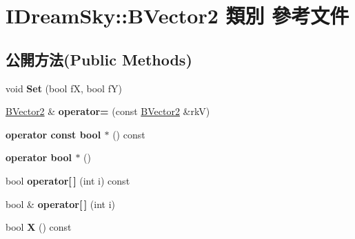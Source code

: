 \hypertarget{class_i_dream_sky_1_1_b_vector2}{}\section{I\+Dream\+Sky\+:\+:B\+Vector2 類別 參考文件}
\label{class_i_dream_sky_1_1_b_vector2}
\subsection*{公開方法(Public Methods)}
\begin{DoxyCompactItemize}
\item 
void {\bfseries Set} (bool fX, bool fY)\hypertarget{class_i_dream_sky_1_1_b_vector2_a5d9258bbdf9efe742dc9b8524910a640}{}\label{class_i_dream_sky_1_1_b_vector2_a5d9258bbdf9efe742dc9b8524910a640}

\item 
\hyperlink{class_i_dream_sky_1_1_b_vector2}{B\+Vector2} \& {\bfseries operator=} (const \hyperlink{class_i_dream_sky_1_1_b_vector2}{B\+Vector2} \&rkV)\hypertarget{class_i_dream_sky_1_1_b_vector2_a94eab483e1d4d3217e1b52c0e3b0c710}{}\label{class_i_dream_sky_1_1_b_vector2_a94eab483e1d4d3217e1b52c0e3b0c710}

\item 
{\bfseries operator const bool $\ast$} () const \hypertarget{class_i_dream_sky_1_1_b_vector2_a0402e37524345210f1ad5a58d5818caa}{}\label{class_i_dream_sky_1_1_b_vector2_a0402e37524345210f1ad5a58d5818caa}

\item 
{\bfseries operator bool $\ast$} ()\hypertarget{class_i_dream_sky_1_1_b_vector2_a3ab985b22b818bee3a047074d18f004f}{}\label{class_i_dream_sky_1_1_b_vector2_a3ab985b22b818bee3a047074d18f004f}

\item 
bool {\bfseries operator\mbox{[}$\,$\mbox{]}} (int i) const \hypertarget{class_i_dream_sky_1_1_b_vector2_adffd6ff2c910f79137becd8ebd0a7c99}{}\label{class_i_dream_sky_1_1_b_vector2_adffd6ff2c910f79137becd8ebd0a7c99}

\item 
bool \& {\bfseries operator\mbox{[}$\,$\mbox{]}} (int i)\hypertarget{class_i_dream_sky_1_1_b_vector2_a18c1453115edd61e53a3cba74ceca299}{}\label{class_i_dream_sky_1_1_b_vector2_a18c1453115edd61e53a3cba74ceca299}

\item 
bool {\bfseries X} () const \hypertarget{class_i_dream_sky_1_1_b_vector2_a6dff565926a8def59ff2750b9e770e4c}{}\label{class_i_dream_sky_1_1_b_vector2_a6dff565926a8def59ff2750b9e770e4c}


\end{DoxyCompactItemize}
